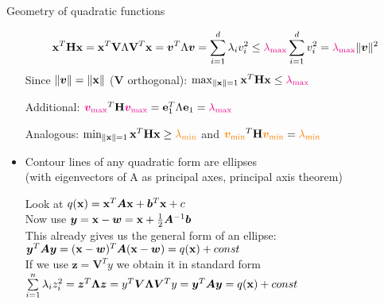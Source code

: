 \documentclass[11pt,compress,t,notes=noshow, xcolor=table]{beamer}
\begin{document}
\begin{vbframe}{Geometry of quadratic functions}
\begin{itemize}
\begin{footnotesize}
            \vspace{-\baselineskip}
            
            \begin{equation*}
                \mathbf{x}^T \mathbf{H} \mathbf{x} = \mathbf{x}^T\mathbf{V}\Lambda\mathbf{V}^T\mathbf{x} = \bm{v}^T\Lambda\bm{v} = \sum_{i=1}^d \lambda_iv_i^2 \leq \textcolor{magenta}{\lambda_\text{max}} \sum_{i=1}^d v_i^2 = \textcolor{magenta}{\lambda_\text{max}}\|\bm{v}\|^2
            \end{equation*}
            Since $\|\bm{v}\| = \|\mathbf{x}\|$ ($\mathbf{V}$ orthogonal): $\max_{\|\mathbf{x}\|=1} \mathbf{x}^T \mathbf{H} \mathbf{x} \leq \textcolor{magenta}{\lambda_\text{max}}$
            
            Additional: $\textcolor{magenta}{\bm{v}_\text{max}}^T \mathbf{H} \textcolor{magenta}{\bm{v}_\text{max}} = \mathbf{e}_1^T\Lambda\mathbf{e}_1 = \textcolor{magenta}{\lambda_\text{max}}$

            Analogous: $\min_{\|\mathbf{x}\|=1} \mathbf{x}^T \mathbf{H} \mathbf{x} \geq \textcolor{orange}{\lambda_\text{min}}$ and $\textcolor{orange}{\bm{v}_\text{min}}^T \mathbf{H} \textcolor{orange}{\bm{v}_\text{min}} = \textcolor{orange}{\lambda_\text{min}}$
        \end{footnotesize}

    \medskip

    \item Contour lines of any quadratic form are ellipses \\
    (with eigenvectors of A as principal axes, principal axis theorem)
        \vspace{0.25\baselineskip}
    
        \begin{footnotesize}
        Look at $q(\mathbf{x}) = \mathbf{x}^T \bm{A} \mathbf{x} + \bm{b}^T \mathbf{x} + c$ \\
        Now use $\bm{y} = \mathbf{x} - \bm{w} = \mathbf{x} + \frac{1}{2} \bm{A}^{-1} \bm{b}$\\
        This already gives us the general form of an ellipse:\\
        $\bm{y}^T \bm{A} \bm{y} = (\mathbf{x}-\bm{w})^T \bm{A} (\mathbf{x}-\bm{w}) = q(\mathbf{x}) + const$\\
        If we use $\bm{z} = \bm{V}^T y$ we obtain it in standard form\\
        $\sum\limits_{i=1}^n \lambda_i z_i^2 = \bm{z}^T \bm{\Lambda} \bm{z} = y^T \bm{V} \bm{\Lambda} \bm{V}^T y = \bm{y}^T \bm{A} \bm{y} = q(\mathbf{x}) + const $
        \end{footnotesize}

        


\end{itemize}
\end{vbframe}
\end{document}
